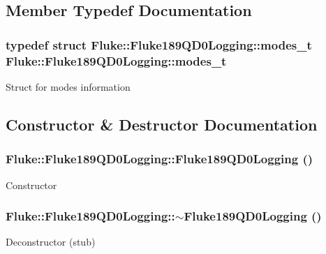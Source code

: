 \subsection{Member Typedef Documentation}
\hypertarget{classFluke_1_1Fluke189QD0Logging_aa9e03c2f5b92478c1f3182fc7b9a0a60}{
\subsubsection[{modes\_\-t}]{\setlength{\rightskip}{0pt plus 5cm}typedef struct {\bf Fluke::Fluke189QD0Logging::modes\_\-t}  {\bf Fluke::Fluke189QD0Logging::modes\_\-t}}}
\label{classFluke_1_1Fluke189QD0Logging_aa9e03c2f5b92478c1f3182fc7b9a0a60}
Struct for modes information 

\subsection{Constructor \& Destructor Documentation}
\hypertarget{classFluke_1_1Fluke189QD0Logging_ab856daf79c71ace0841c10c9f9b8f9e6}{
\subsubsection[{Fluke189QD0Logging}]{\setlength{\rightskip}{0pt plus 5cm}Fluke::Fluke189QD0Logging::Fluke189QD0Logging ()}}
\label{classFluke_1_1Fluke189QD0Logging_ab856daf79c71ace0841c10c9f9b8f9e6}
Constructor \hypertarget{classFluke_1_1Fluke189QD0Logging_ac134feed3bec91193ba7ffd119f9833d}{
\subsubsection[{$\sim$Fluke189QD0Logging}]{\setlength{\rightskip}{0pt plus 5cm}Fluke::Fluke189QD0Logging::$\sim$Fluke189QD0Logging ()}}
\label{classFluke_1_1Fluke189QD0Logging_ac134feed3bec91193ba7ffd119f9833d}
Deconstructor (stub) 

